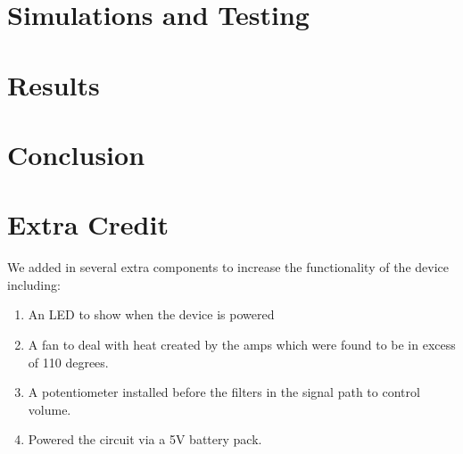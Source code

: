 \documentclass{article}
\begin{document}
\section*{Simulations and Testing}

\section*{Results}

\section*{Conclusion}

\section*{Extra Credit}
We added in several extra components to increase the functionality of the 
device including:
\begin{enumerate}
\item An LED to show when the device is powered
\item A fan to deal with heat created by the amps which were found to be in
 excess of 110 degrees.
\item A potentiometer installed before the filters in the signal path to 
control volume.
\item Powered the circuit via a 5V battery pack.
\end{enumerate}
\end{document}
